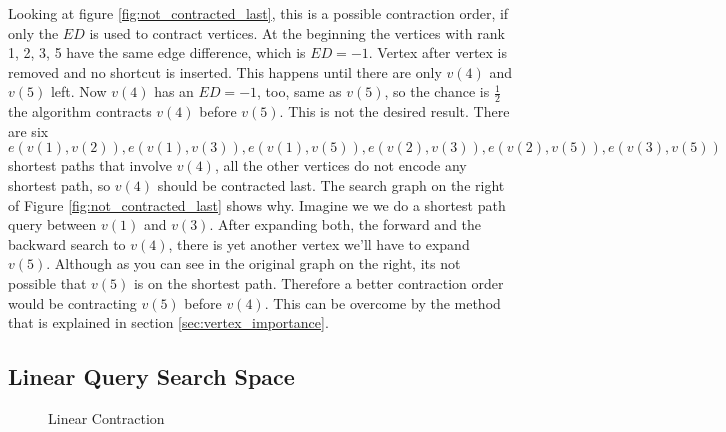 Looking at figure \ref{fig:not_contracted_last}, this is a possible contraction order, if only the $ED$ is used to contract vertices.
At the beginning the vertices with rank 1, 2, 3, 5 have the same edge difference, which is $ED = -1$.
Vertex after vertex is removed  and  no shortcut is inserted.
This happens until there are only $v(4)$ and $v(5)$ left.
Now $v(4)$ has an $ED=-1$, too, same as $v(5)$, so the chance is $\frac{1}{2}$ the algorithm contracts $v(4)$ before $v(5)$.
This is not the desired result.
There are six \\$e(v(1),v(2)), e(v(1),v(3)), e(v(1),v(5)), e(v(2),v(3)), e(v(2),v(5)), e(v(3),v(5))$  shortest paths that involve  $v(4)$, all the other vertices do not encode any shortest path, so $v(4)$ should be contracted last.
The search graph on the right of Figure \ref{fig:not_contracted_last} shows why.
Imagine we we do a shortest path query between $v(1)$ and $v(3)$.
After expanding both, the forward and the backward search to $v(4)$, there is yet another vertex we'll have to expand $v(5)$.
Although as you can see in the original graph on the right, its not possible that $v(5)$ is on the shortest path.
Therefore a better contraction order would be contracting $v(5)$ before $v(4)$.
This can be overcome by the method that is explained in section \ref{sec:vertex_importance}.

\subsection{Linear Query Search Space}\label{sec:linear_query}

\begin{figure}
\centering

\caption{Linear Contraction}
\label{fig:linear_contraction}
\end{figure}

